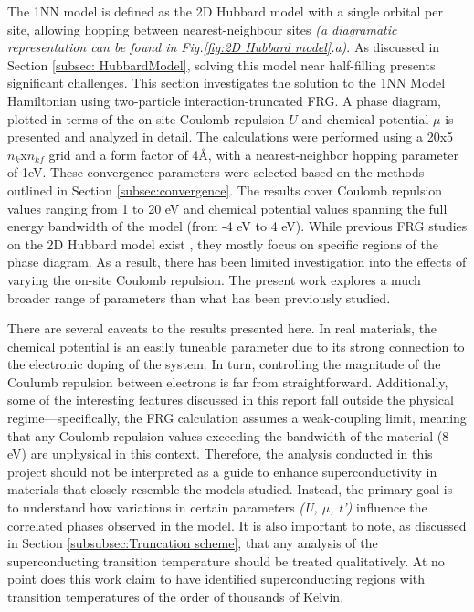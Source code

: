 \documentclass[12pt]{article}
\begin{document}
The 1NN model is defined as the 2D Hubbard model with a single orbital per site,  allowing hopping between nearest-neighbour sites \textit{(a diagramatic representation can be found in Fig.\ref{fig:2D Hubbard model}.a)}. 
As discussed in Section \ref{subsec: HubbardModel}, solving this model near half-filling presents significant challenges. This section investigates the solution to the 1NN Model Hamiltonian using two-particle interaction-truncated FRG. A phase diagram, plotted in terms of the on-site Coulomb repulsion 
$U$ and chemical potential $\mu$ is presented and analyzed in detail. The calculations were performed using a 20x5 $n_k$x$n_{kf}$
grid and a form factor of 4\AA, with a nearest-neighbor hopping parameter of 1eV.
These convergence parameters were selected based on the methods outlined in Section \ref{subsec:convergence}. 
The results cover Coulomb repulsion values ranging from 1 to 20 eV and chemical potential values spanning the full energy bandwidth 
of the model (from -4 eV to 4 eV). While previous FRG studies on the 2D Hubbard model exist \cite{beyer2023rashba,hille2020quantitative,vilardi2020dynamical},
they mostly focus on specific regions of the phase diagram. As a result, there has been limited investigation into the effects of varying the on-site Coulomb repulsion.
The present work explores a much broader range of parameters than what has been previously studied.\par
\medskip


\noindent There are several caveats to the results presented here. In real materials,  the chemical potential is an easily tuneable parameter due to its strong connection to the electronic doping of the system.
In turn, controlling the magnitude of the Coulumb repulsion between electrons is far from straightforward. 
Additionally, some of the interesting features discussed in this report fall outside the physical regime—specifically, the FRG calculation assumes a weak-coupling limit, meaning that any Coulomb 
repulsion values exceeding the bandwidth of the material (8 eV) are unphysical in this context.
Therefore, the analysis conducted in this project should not be interpreted as a guide to enhance superconductivity in materials that closely resemble the models studied.
Instead, the primary goal is to understand how variations in certain parameters \textit{(U, $\mu$, t')} influence the correlated phases observed in the model. 
It is also important to note, as discussed in Section \ref{subsubsec:Truncation scheme}, that any analysis of the 
superconducting transition temperature should be treated qualitatively. At no point does this work claim to have identified superconducting 
regions with transition temperatures of the order of thousands of Kelvin.
\end{document}
